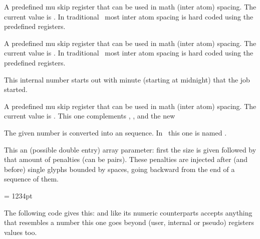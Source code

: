 \stopnewprimitive

\startoldprimitive[title={\prm {thickmuskip}}]

A predefined mu skip register that can be used in math (inter atom) spacing. The
current value is {\tt \the\thickmuskip}. In traditional \TEX\ most inter atom
spacing is hard coded using the predefined registers.

\stopoldprimitive

\startoldprimitive[title={\prm {thinmuskip}}]

A predefined mu skip register that can be used in math (inter atom) spacing. The
current value is {\tt \the\thinmuskip}. In traditional \TEX\ most inter atom
spacing is hard coded using the predefined registers.

\stopoldprimitive

\startoldprimitive[title={\prm {time}}]

This internal number starts out with minute (starting at midnight) that the job
started.

\stopoldprimitive

\startnewprimitive[title={\prm {tinymuskip}}]

A predefined mu skip register that can be used in math (inter atom) spacing. The
current value is {\tt \the\tinymuskip}. This one complements ,
,  and the new 

\stopnewprimitive

\startnewprimitive[title={\prm {tocharacter}}]

The given number is converted into an  sequence. In \LUATEX\ this one is
named \type {\Uchar}.

\stopnewprimitive

\startnewprimitive[title={\prm {toddlerpenalties}}]

This an (possible double entry) array parameter: first the size is given followed
by that amount of penalties (can be pairs). These penalties are injected after
(and before) single glyphs bounded by spaces, going backward from the end of a
sequence of them.

\stopnewprimitive

\startnewprimitive[title={\prm {todimension}}]

\startbuffer
\scratchdimen = 1234pt \todimension\scratchdimen
\stopbuffer

The following code gives this: {\nospacing\inlinebuffer} and like its numeric
counterparts accepts anything that resembles a number this one goes beyond
(user, internal or pseudo) registers values too.

